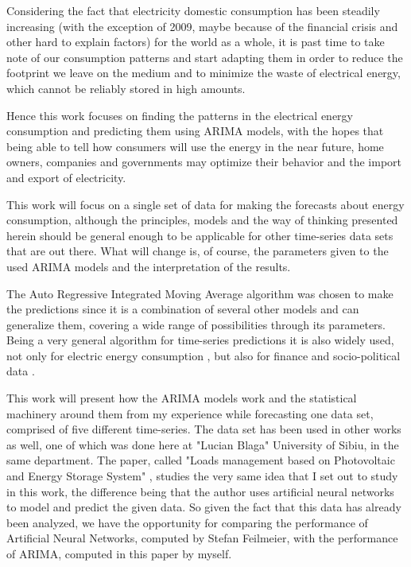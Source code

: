 \documentclass[12pt,a4paper,titlepage]{report}
\begin{document}
Considering the fact that electricity domestic consumption has been steadily increasing (with the exception of 2009, maybe because of the financial crisis and other hard to explain factors) \cite{enerdata} for the world as a whole, it is past time to take note of our consumption patterns and start adapting them in order to reduce the footprint we leave on the medium and to minimize the waste of electrical energy, which cannot be reliably stored in high amounts.

Hence this work focuses on finding the patterns in the electrical energy consumption and predicting them using ARIMA models, with the hopes that being able to tell how consumers will use the energy in the near future, home owners, companies and governments may optimize their behavior and the import and export of electricity.

This work will focus on a single set of data for making the forecasts about energy consumption, although the principles, models and the way of thinking presented herein should be general enough to be applicable for other time-series data sets that are out there. What will change is, of course, the parameters given to the used ARIMA models and the interpretation of the results.

The Auto Regressive Integrated Moving Average algorithm was chosen to make the predictions since it is a combination of several other models and can generalize them, covering a wide range of possibilities through its parameters. Being a very general algorithm for time-series predictions it is also widely used, not only for electric energy consumption \cite{bouzerdoum}, but also for finance and socio-political data \cite{fpp2}.

This work will present how the ARIMA models work and the statistical machinery around them from my experience while forecasting one data set, comprised of five different time-series. The data set has been used in other works as well, one of which was done here at "Lucian Blaga" University of Sibiu, in the same department. The paper, called "Loads management based on Photovoltaic and Energy Storage System" \cite{feilmeier}, studies the very same idea that I set out to study in this work, the difference being that the author uses artificial neural networks to model and predict the given data. So given the fact that this data has already been analyzed, we have the opportunity for comparing the performance of Artificial Neural Networks, computed by Stefan Feilmeier, with the performance of ARIMA, computed in this paper by myself.
\end{document}
